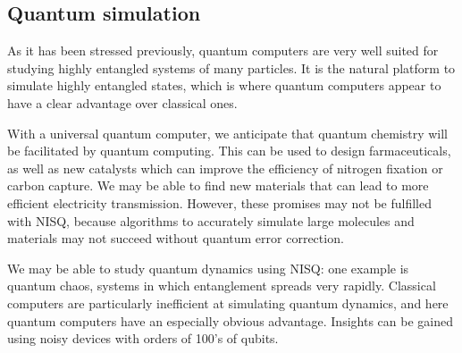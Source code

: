 \subsection{Quantum simulation}
As it has been stressed previously, quantum computers are very well suited for studying highly entangled systems of many particles. It is the natural platform to simulate highly entangled states, which is where quantum computers appear to have a clear advantage over classical ones.
 
With a universal quantum computer, we anticipate that quantum chemistry will be facilitated by quantum computing. This can be used to design farmaceuticals, as well as new catalysts which can improve the efficiency of nitrogen fixation or carbon capture. We may be able to find new materials that can lead to more efficient electricity transmission. However, these promises may not be fulfilled with NISQ, because algorithms to accurately simulate large molecules and materials may not succeed without quantum error correction.

We may be able to study quantum dynamics using NISQ: one example is quantum chaos, systems in which entanglement spreads very rapidly. Classical computers are particularly inefficient at simulating quantum dynamics, and here quantum computers have an especially obvious advantage. Insights can be gained using noisy devices with orders of 100's of qubits.


